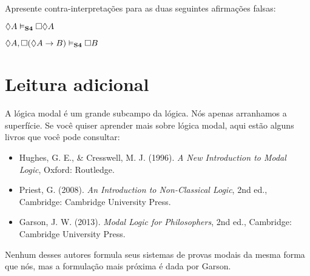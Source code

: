 \problempart
Apresente contra-interpretações para as duas seguintes afirmações falsas:
\begin{earg}
	\item $\Diamond A\vDash_{\mathbf{S4}} \Box\Diamond A$
	\item $\Diamond A, \Box (\Diamond A \rightarrow B)\vDash_{\mathbf{S4}}\Box B$
\end{earg}

\section*{Leitura adicional}

A lógica modal é um grande subcampo da lógica. Nós apenas arranhamos a superfície. Se você quiser aprender mais sobre lógica modal, aqui estão alguns livros que você pode consultar:

\begin{itemize}
	\item Hughes, G. E., \& Cresswell, M. J. (1996). \emph{A New Introduction to Modal Logic}, Oxford: Routledge.
	\item Priest, G. (2008). \emph{An Introduction to Non-Classical Logic}, 2nd ed., Cambridge: Cambridge University Press.
	\item Garson, J. W. (2013). \emph{Modal Logic for Philosophers}, 2nd ed., Cambridge: Cambridge University Press.
\end{itemize}

Nenhum desses autores formula seus sistemas de provas modais da mesma forma que nós, mas a formulação mais próxima é dada por Garson. 



